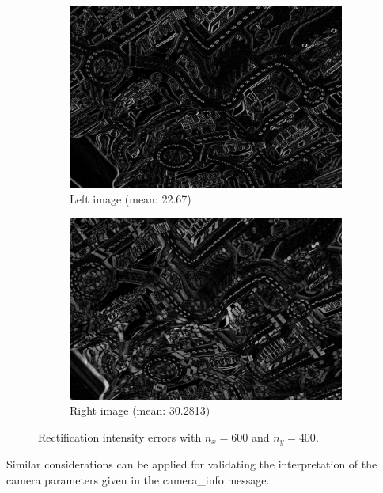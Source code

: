 \begin{figure}[h]
  \centering
  \begin{subfigure}[b]{0.49\textwidth}
    \includegraphics[width=\textwidth]{figures/rect_r1.jpg} 
    \caption{Left image (mean: 22.67)} 
    \label{fig:rect_r1}
  \end{subfigure}
  \begin{subfigure}[b]{0.49\textwidth}
    \includegraphics[width=\textwidth]{figures/rect_r2.jpg} 
    \caption{Right image (mean: 30.2813)}
    \label{fig:rect_r2}
  \end{subfigure}
  \caption{Rectification intensity errors with $n_x = 600$ and $n_y = 400$.}
\end{figure}

Similar considerations can be applied for validating the interpretation of the
camera parameters given in the camera\_info message.

